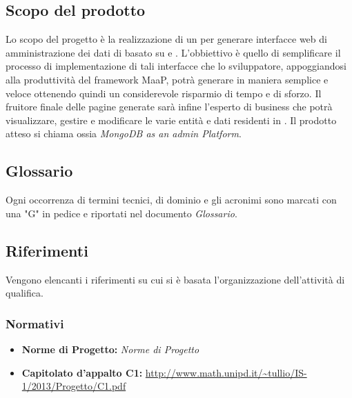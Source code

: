 \subsection{Scopo del prodotto}
Lo scopo del progetto è la realizzazione di un  per generare interfacce web di amministrazione dei dati di  basato su   e . L'obbiettivo è quello di semplificare il processo di implementazione di tali interfacce che lo sviluppatore, appoggiandosi alla produttività del framework MaaP, potrà generare in maniera semplice e veloce ottenendo quindi un considerevole risparmio di tempo e di sforzo. Il fruitore finale delle pagine generate sarà infine l'esperto di business che potrà visualizzare, gestire e modificare le varie entità e dati residenti in .
Il prodotto atteso si chiama  ossia \emph{MongoDB as an admin Platform}. 

\subsection{Glossario}
Ogni occorrenza di termini tecnici, di dominio e gli acronimi sono marcati con una "G" in pedice e riportati nel documento \emph{Glossario}.

\subsection{Riferimenti}
Vengono elencanti i riferimenti su cui si è basata l'organizzazione dell'attività di qualifica.
	\subsubsection{Normativi}
		\begin{itemize}
  			\item \textbf{Norme di Progetto:}  \emph{Norme di Progetto}
			\item \textbf{Capitolato d'appalto C1:} \url{http://www.math.unipd.it/~tullio/IS-1/2013/Progetto/C1.pdf}
		\end{itemize}
